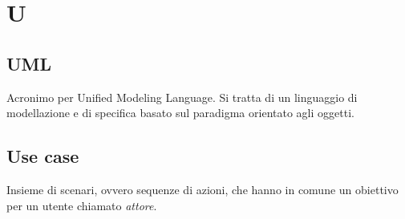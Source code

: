 \chapter{U}
\section{UML}\label{sec:Unified Modeling Language}
Acronimo per Unified Modeling Language. Si tratta di un linguaggio di modellazione e di specifica basato sul paradigma orientato agli oggetti.

\section{Use case}\label{sec:Use Cases}
Insieme di scenari, ovvero sequenze di azioni, che hanno in comune un obiettivo per un utente chiamato \emph{attore}.
